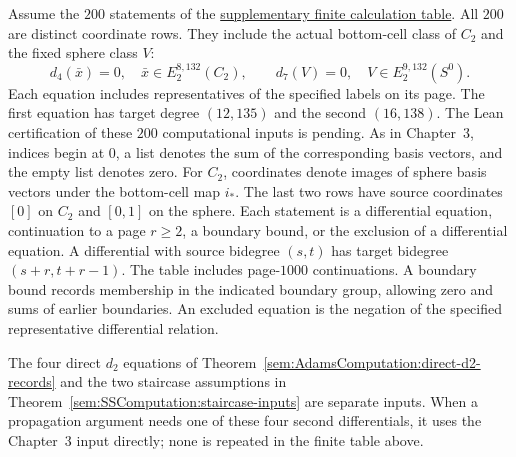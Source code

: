 \begin{theorem}
\label{sem:SSComputation:admitted-finite-inputs}
\label{sem:Computation:table-certification}
\label{sem:SSComputation:ordinary-differential-inputs}
Assume the $200$ statements of the
\href{paper/finite-calculations.html}{supplementary finite calculation table}.
All $200$ are distinct coordinate rows. They include the actual bottom-cell
class of $C_2$ and the fixed sphere class $V$:
\[
 d_4(\bar x)=0,\quad \bar x\in E_2^{8,132}(C_2),\qquad
 d_7(V)=0,\quad V\in E_2^{9,132}(S^0).
\]
Each equation includes representatives of the specified labels on its page.
The first equation has target degree $(12,135)$ and the second $(16,138)$.
The Lean certification of these $200$ computational inputs is pending.
As in Chapter~3, indices
begin at $0$, a list denotes the sum of the corresponding basis
vectors, and the empty list denotes zero. For $C_2$, coordinates denote
images of sphere basis vectors under the bottom-cell map $i_*$. The last
two rows have source coordinates $[0]$ on $C_2$ and $[0,1]$ on the sphere.
Each statement is a
differential equation, continuation to a page $r\ge2$, a boundary bound,
or the exclusion of a differential equation. A differential with source
bidegree $(s,t)$ has target bidegree $(s+r,t+r-1)$. The table includes
page-$1000$ continuations.
A boundary bound records membership in the indicated boundary group,
allowing zero and sums of earlier boundaries. An excluded equation is
the negation of the specified representative differential relation.

The four direct $d_2$ equations of
Theorem~\ref{sem:AdamsComputation:direct-d2-records} and the two staircase
assumptions in Theorem~\ref{sem:SSComputation:staircase-inputs} are separate
inputs. When a propagation argument needs one of these four second
differentials, it uses the Chapter~3 input directly; none is repeated in
the finite table above.
\end{theorem}

